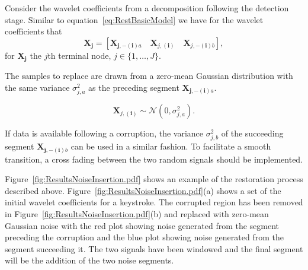 Consider the wavelet coefficients from a decomposition following the detection stage. Similar to equation~\ref{eq:RestBasicModel} we have for the wavelet coefficients that
\begin{equation}\label{eq:RestBasicModelWavelet1}
\boldsymbol{X_j} = \left[ \boldsymbol{X}_{\boldsymbol{j,-(i)}a}\quad\boldsymbol{X}_{j,\boldsymbol{(i)}}\quad\boldsymbol{X}_{j,\boldsymbol{-(i)}b} \right],
\end{equation}
for $\boldsymbol{X_j}$ the $j$th terminal node, $j \in \{1, \ldots, J\}$.

The samples to replace are drawn from a zero-mean Gaussian distribution with the same variance $\sigma^2_{j,a}$ as the preceding segment $\boldsymbol{X}_{\boldsymbol{j,-(i)}a}$.

\begin{equation}\label{eq:RestNoiseInsertionModelVariance1}
\boldsymbol{X}_{j,\boldsymbol{(i)}} \sim \mathcal{N}\left(0, \sigma^2_{j,a} \right).
\end{equation}

If data is available following a corruption, the variance $\sigma^2_{j,b}$ of the succeeding segment $\boldsymbol{X}_{\boldsymbol{j,-(i)}b}$ can be used in a similar fashion. To facilitate a smooth transition, a cross fading between the two random signals should be implemented.

Figure~\ref{fig:ResultsNoiseInsertion.pdf} shows an example of the restoration process described above. Figure~\ref{fig:ResultsNoiseInsertion.pdf}(a) shows a set of the initial wavelet coefficients for a keystroke. The corrupted region has been removed in Figure~\ref{fig:ResultsNoiseInsertion.pdf}(b) and replaced with zero-mean Gaussian noise with the red plot showing noise generated from the segment preceding the corruption and the blue plot showing noise generated from the segment succeeding it. The two signals have been windowed and the final segment will be the addition of the two noise segments.

